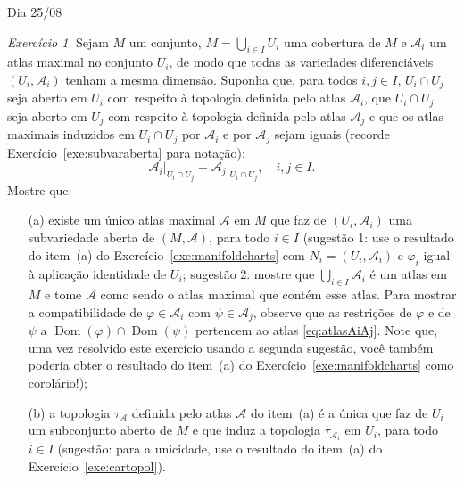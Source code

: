 \documentclass[oneside,11pt]{amsart}
\DeclareMathOperator{\Dom}{Dom}
\theoremstyle{remark}\newtheorem{exercise}{Exercício}[section]
\theoremstyle{plain}\newtheorem{teo}{Teorema}[section]
\theoremstyle{plain}\newtheorem{lem}[teo]{Lema}
\theoremstyle{plain}\newtheorem{prop}[teo]{Proposição}
\theoremstyle{definition}\newtheorem{defin}[teo]{Definição}
\theoremstyle{remark}\newtheorem{rem}[teo]{Observação}
\theoremstyle{definition}\newtheorem{example}[teo]{Exemplo}
\numberwithin{equation}{section}
\begin{document}
\begin{section}{Dia 25/08}
\begin{exercise}\label{exe:locmanifold}
Sejam $M$ um conjunto, $M=\bigcup_{i\in I}U_i$ uma cobertura de $M$ e $\mathcal A_i$ um atlas maximal no conjunto $U_i$, de modo que todas as variedades
diferenciáveis $(U_i,\mathcal A_i)$ tenham a mesma dimensão. Suponha que, para todos $i,j\in I$, $U_i\cap U_j$ seja aberto em $U_i$ com respeito à topologia
definida pelo atlas $\mathcal A_i$, que $U_i\cap U_j$ seja aberto em $U_j$ com respeito à topologia definida pelo atlas $\mathcal A_j$ e que os atlas
maximais induzidos em $U_i\cap U_j$ por $\mathcal A_i$ e por $\mathcal A_j$ sejam iguais (recorde Exercício~\ref{exe:subvaraberta}
para notação):
\begin{equation}\label{eq:atlasAiAj}
\mathcal A_i\vert_{U_i\cap U_j}=\mathcal A_j\vert_{U_i\cap U_j},\quad i,j\in I.
\end{equation}
Mostre que:
\begin{itemize}
\item[(a)] existe um único atlas maximal $\mathcal A$ em $M$ que faz de $(U_i,\mathcal A_i)$ uma subvariedade aberta de $(M,\mathcal A)$, para todo $i\in I$
(sugestão 1: use o resultado do item~(a) do Exercício~\ref{exe:manifoldcharts} com $N_i=(U_i,\mathcal A_i)$ e $\varphi_i$ igual à aplicação identidade de $U_i$;
sugestão 2: mostre que $\bigcup_{i\in I}\mathcal A_i$ é um atlas em $M$ e tome $\mathcal A$ como sendo o atlas maximal que contém esse atlas. Para mostrar
a compatibilidade de $\varphi\in\mathcal A_i$ com $\psi\in\mathcal A_j$, observe que as restrições de $\varphi$ e de $\psi$ a $\Dom(\varphi)\cap\Dom(\psi)$ pertencem
ao atlas \eqref{eq:atlasAiAj}. Note que, uma vez resolvido este exercício usando a segunda sugestão, você também poderia
obter o resultado do item~(a) do Exercício~\ref{exe:manifoldcharts} como corolário!);
\item[(b)] a topologia $\tau_{\mathcal A}$ definida pelo atlas $\mathcal A$ do item~(a) é a única que faz de $U_i$ um subconjunto aberto de $M$ e que
induz a topologia $\tau_{\mathcal A_i}$ em $U_i$, para todo $i\in I$ (sugestão: para a unicidade,
use o resultado do item~(a) do Exercício~\ref{exe:cartopol}).
\end{itemize}
\end{exercise}


\end{section}
\end{document}
